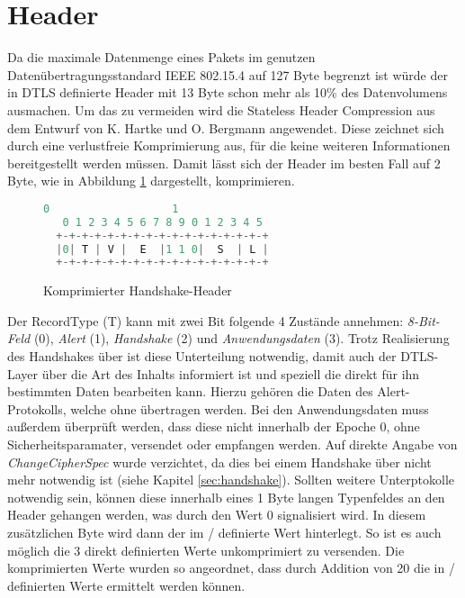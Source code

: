 \section{Header}
\label{sec:headercompression}

Da die maximale Datenmenge eines Pakets im genutzen Datenübertragungsstandard IEEE 802.15.4 \cite{ieee802154} auf 127 Byte begrenzt ist würde der in DTLS
definierte Header mit 13 Byte schon mehr als 10\% des Datenvolumens ausmachen. Um das zu vermeiden wird die Stateless Header Compression aus dem Entwurf
von K. Hartke und O. Bergmann \cite[Kapitel 3]{draftcodtls} angewendet. Diese zeichnet sich durch eine verlustfreie Komprimierung aus, für die keine weiteren
Informationen bereitgestellt werden müssen. Damit lässt sich der Header im besten Fall auf 2 Byte, wie in Abbildung \ref{fig:com_handshake_header} dargestellt,
komprimieren.

\begin{figure}[ht]
  \centering
  \begin{lstlisting}[language=c]
   0                   1
   0 1 2 3 4 5 6 7 8 9 0 1 2 3 4 5
  +-+-+-+-+-+-+-+-+-+-+-+-+-+-+-+-+
  |0| T | V |  E  |1 1 0|  S  | L |
  +-+-+-+-+-+-+-+-+-+-+-+-+-+-+-+-+
  \end{lstlisting}
  \caption{Komprimierter Handshake-Header}
  \label{fig:com_handshake_header}
\end{figure}

Der RecordType (T) kann mit zwei Bit folgende 4 Zustände annehmen: \textit{8-Bit-Feld} (0), \textit{Alert} (1), \textit{Handshake} (2) und
\textit{Anwendungsdaten} (3). Trotz Realisierung des Handshakes über  ist diese Unterteilung notwendig, damit auch der DTLS-Layer über die
Art des Inhalts informiert ist und speziell die direkt für ihn bestimmten Daten bearbeiten kann. Hierzu gehören die Daten des Alert-Protokolls,
welche ohne  übertragen werden. Bei den Anwendungsdaten muss außerdem überprüft werden, dass diese nicht innerhalb der Epoche 0, ohne
Sicherheitsparamater, versendet oder empfangen werden. Auf direkte Angabe von \textit{ChangeCipherSpec} wurde verzichtet, da dies bei einem
Handshake über  nicht mehr notwendig ist (siehe Kapitel \ref{sec:handshake}). Sollten  weitere Unterptokolle notwendig sein, können
diese innerhalb eines 1 Byte langen Typenfeldes an den Header gehangen werden, was durch den Wert 0 signalisiert wird. In diesem zusätzlichen
Byte wird dann der im / definierte Wert hinterlegt. So ist es auch möglich die 3 direkt definierten Werte unkomprimiert zu
versenden. Die komprimierten Werte wurden so angeordnet, dass durch Addition von 20 die in / definierten Werte ermittelt werden können.


